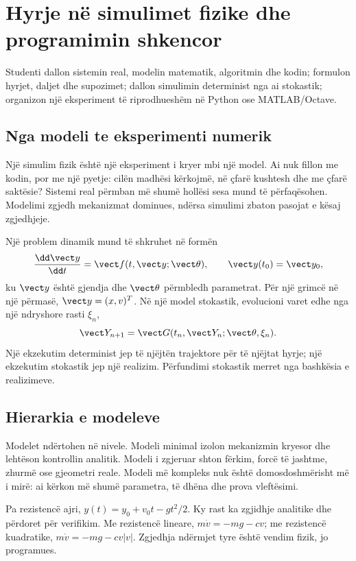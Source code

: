 \chapter{Hyrje në simulimet fizike dhe programimin shkencor}
\begin{qellime}
Studenti dallon sistemin real, modelin matematik, algoritmin dhe kodin; formulon hyrjet, daljet dhe supozimet; dallon simulimin determinist nga ai stokastik; organizon një eksperiment të riprodhueshëm në Python ose MATLAB/Octave.
\end{qellime}

\section{Nga modeli te eksperimenti numerik}
Një simulim fizik është një eksperiment i kryer mbi një model. Ai nuk fillon me kodin, por me një pyetje: cilën madhësi kërkojmë, në çfarë kushtesh dhe me çfarë saktësie? Sistemi real përmban më shumë hollësi sesa mund të përfaqësohen. Modelimi zgjedh mekanizmat dominues, ndërsa simulimi zbaton pasojat e kësaj zgjedhjeje.

Një problem dinamik mund të shkruhet në formën
\begin{equation}
 \frac{\dd \vect y}{\dd t}=\vect f(t,\vect y;\vect\theta),\qquad \vect y(t_0)=\vect y_0,
\end{equation}
ku $\vect y$ është gjendja dhe $\vect\theta$ përmbledh parametrat. Për një grimcë në një përmasë, $\vect y=(x,v)^T$. Në një model stokastik, evolucioni varet edhe nga një ndryshore rasti $\xi_n$,
\begin{equation}
 \vect Y_{n+1}=\vect G(t_n,\vect Y_n;\vect\theta,\xi_n).
\end{equation}
Një ekzekutim determinist jep të njëjtën trajektore për të njëjtat hyrje; një ekzekutim stokastik jep një realizim. Përfundimi stokastik merret nga bashkësia e realizimeve.

\section{Hierarkia e modeleve}
Modelet ndërtohen në nivele. Modeli minimal izolon mekanizmin kryesor dhe lehtëson kontrollin analitik. Modeli i zgjeruar shton fërkim, forcë të jashtme, zhurmë ose gjeometri reale. Modeli më kompleks nuk është domosdoshmërisht më i mirë: ai kërkon më shumë parametra, të dhëna dhe prova vleftësimi.

\begin{shembull}
Pa rezistencë ajri, $y(t)=y_0+v_0t-gt^2/2$. Ky rast ka zgjidhje analitike dhe përdoret për verifikim. Me rezistencë lineare, $m\dot v=-mg-cv$; me rezistencë kuadratike, $m\dot v=-mg-cv|v|$. Zgjedhja ndërmjet tyre është vendim fizik, jo programues.
\end{shembull}


